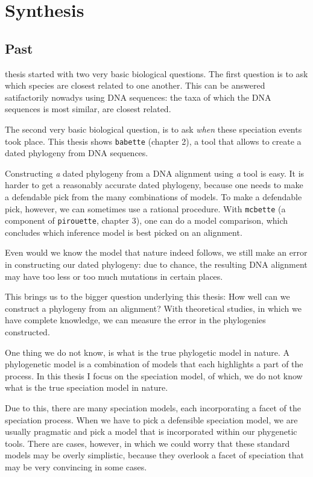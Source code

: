 \chapter{Synthesis}
\label{synthesis}
\newpage

\section{Past}

\noindent

 thesis started with two very basic biological 
questions. The first question is to ask which species are closest related to
one another. This can be answered satifactorily 
nowadys using DNA sequences: the taxa of 
which the DNA sequences is most similar, are closest related.

The second very basic biological question, is to 
ask \emph{when} these speciation events took place.
This thesis shows \verb;babette; (chapter 2), a tool that allows
to create a dated phylogeny from DNA sequences.

Constructing \emph{a} dated phylogeny from a DNA alignment 
using \emph{a} tool is easy.
It is harder to get a reasonably accurate dated phylogeny,
because one needs to make a defendable pick from the many combinations of 
models. To make a defendable pick, however, we can sometimes use
a rational procedure. With \verb;mcbette; (a component of \verb;pirouette;,
chapter 3), one can do a model
comparison, which concludes which inference model is best picked
on an alignment. 

Even would we know the model that nature indeed follows, we
still make an error in constructing our dated phylogeny: due
to chance, the resulting DNA alignment may have 
too less or too much mutations in certain places.

This brings us to the bigger question underlying this thesis:
How well can we construct a phylogeny from an alignment?
With theoretical studies, in which we have complete knowledge,
we can measure the error in the phylogenies constructed.

One thing we do not know, is what is the true phylogetic model
in nature. A phylogenetic model is a combination of models that each
highlights a part of the process. In this thesis I focus
on the speciation model, of which, we do not know what is the
true speciation model in nature.

Due to this, there are many speciation models, each
incorporating a facet of the speciation process. When we have to
pick a defensible speciation model, we are usually pragmatic and
pick a model that is incorporated within our phygenetic
tools. There are cases, however, in which we could worry that these
standard models may be overly simplistic, because they overlook a 
facet of speciation that may be very convincing in some cases.

